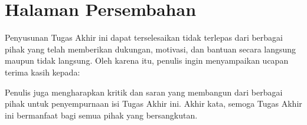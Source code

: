 \chapter*{Halaman Persembahan}
Penyusunan Tugas Akhir ini dapat terselesaikan tidak terlepas dari berbagai pihak yang telah memberikan dukungan, motivasi, dan bantuan secara langsung maupun tidak langsung. Oleh karena itu, penulis ingin menyampaikan ucapan terima kasih kepada: 

%
%
Penulis juga mengharapkan kritik dan saran yang membangun dari berbagai pihak untuk penyempurnaan isi Tugas Akhir ini. Akhir kata, semoga Tugas Akhir ini bermanfaat bagi semua pihak yang bersangkutan.
